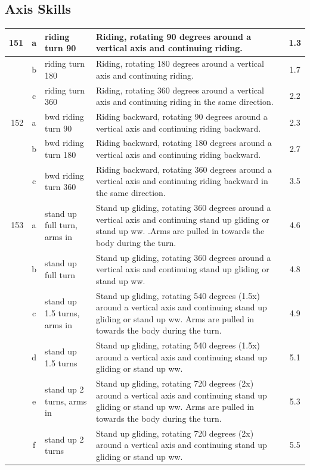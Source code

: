 \subsection{Axis Skills}
\begin{longtable}{|r|c|p{4cm}|p{8cm}|c|}
\hline
151 & a & riding turn 90  & Riding, rotating 90 degrees around a vertical axis and continuing riding. & 1.3 \\ 
\hline
  & b & riding turn 180 & Riding, rotating 180 degrees around a vertical axis and continuing riding.  & 1.7 \\ 
\hline
  & c & riding turn 360 & Riding, rotating 360 degrees around a vertical axis and continuing riding in the same direction.  & 2.2 \\ 
\hline
152 & a & bwd riding turn 90  & Riding backward, rotating 90 degrees around a vertical axis and continuing riding backward. & 2.3 \\ 
\hline
  & b & bwd riding turn 180 & Riding backward, rotating 180 degrees around a vertical axis and continuing riding backward.  & 2.7 \\ 
\hline
  & c & bwd riding turn 360 & Riding backward, rotating 360 degrees around a vertical axis and continuing riding backward in the same direction.  & 3.5 \\ 
\hline
153 & a & stand up full turn, arms in & Stand up gliding, rotating 360 degrees around a vertical axis and continuing stand up gliding or stand up ww. .Arms are pulled in towards the body during the turn. & 4.6 \\ 
\hline
  & b & stand up full turn  & Stand up gliding, rotating 360 degrees around a vertical axis and continuing stand up gliding or stand up ww. & 4.8 \\ 
\hline
  & c & stand up 1.5 turns, arms in & Stand up gliding, rotating 540 degrees (1.5x) around a vertical axis and continuing stand up gliding or stand up ww. Arms are pulled in towards the body during the turn. & 4.9 \\ 
\hline
  & d & stand up 1.5 turns  & Stand up gliding, rotating 540 degrees (1.5x) around a vertical axis and continuing stand up gliding or stand up ww.  & 5.1 \\ 
\hline
  & e & stand up 2 turns, arms in & Stand up gliding, rotating 720 degrees (2x) around a vertical axis and continuing stand up gliding or stand up ww. Arms are pulled in towards the body during the turn. & 5.3 \\ 
\hline
  & f & stand up 2 turns  & Stand up gliding, rotating 720 degrees (2x) around a vertical axis and continuing stand up gliding or stand up ww.  & 5.5 \\ 

\end{longtable}
